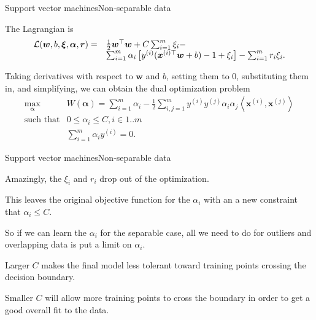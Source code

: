 \documentclass{beamer}
\renewcommand{\vec}[1]{\boldsymbol{#1}}
\begin{document}
\begin{frame}{Support vector machines}{Non-separable data}

  The Lagrangian is
  \[ \begin{array}{rl}
    {\cal L}(\vec{w},b,\vec{\xi},\vec{\alpha},\vec{r}) =
  &\frac{1}{2}\vec{w}^\top \vec{w} + C\sum_{i=1}^m\xi_i -\\
  &\sum_{i=1}^m\alpha_i \left[ y^{(i)}(\vec{x}^{(i)\top}\vec{w}+b)-1+\xi_i\right] -
  \sum_{i=1}^mr_i\xi_i . \end{array} \]

  \medskip

  Taking derivatives with respect to $\vec{w}$ and $b$, setting them
  to 0, substituting them in, and simplifying, we can obtain the dual
  optimization problem
  \[ \begin{array}{rl} \max_{\vec{\alpha}} & W(\vec{\alpha}) = \sum_{i=1}^m\alpha_i
    - \frac{1}{2}\sum_{i,j=1}^my^{(i)}y^{(j)}\alpha_i\alpha_j
    \left< \vec{x}^{(i)},\vec{x}^{(j)}\right> \\
    \text{such that} & 0 \le \alpha_i \le C, i \in 1..m \\
    & \sum_{i=1}^m \alpha_i y^{(i)} = 0 .\end{array} \]

\end{frame}


\begin{frame}{Support vector machines}{Non-separable data}

  Amazingly, the $\xi_i$ and $r_i$ drop out of the optimization.

  \medskip

  This leaves the original objective function for the $\alpha_i$ with
  an a new constraint that $\alpha_i \le C$.

  \medskip

  So if we can learn the $\alpha_i$ for the separable case, all we need
  to do for outliers and overlapping data is put a limit on $\alpha_i$.

  \medskip

  Larger $C$ makes the final model less tolerant toward training
  points crossing the decision boundary.

  \medskip

  Smaller $C$ will allow more training points to cross the boundary
  in order to get a good overall fit to the data.
  
\end{frame}
\end{document}

